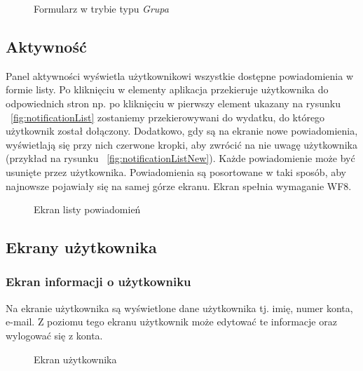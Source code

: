 \begin{figure}[h!]%
    \centering
    \caption{Formularz w trybie typu \emph{Grupa}}
\end{figure}

\clearpage
\subsection{Aktywność}
Panel aktywności wyświetla użytkownikowi wszystkie dostępne powiadomienia w formie listy. Po kliknięciu w elementy aplikacja przekieruje użytkownika do odpowiednich stron np. po kliknięciu w pierwszy element ukazany na rysunku ~\ref{fig:notificationList} zostaniemy przekierowywani do wydatku, do którego użytkownik został dołączony. Dodatkowo, gdy są na ekranie nowe powiadomienia, wyświetlają się przy nich czerwone kropki, aby zwrócić na nie uwagę użytkownika (przykład na rysunku ~\ref{fig:notificationListNew}). Każde powiadomienie może być usunięte przez użytkownika. Powiadomienia są posortowane w taki sposób, aby najnowsze pojawiały się na samej górze ekranu. Ekran spełnia wymaganie WF8.

\begin{figure}[h!]%
    \centering
    \qquad
    \caption{Ekran listy powiadomień}%
\end{figure}

\clearpage
\subsection{Ekrany użytkownika}
\subsubsection{Ekran informacji o użytkowniku}
Na ekranie użytkownika są wyświetlone dane użytkownika tj. imię, numer konta, e-mail. Z poziomu tego ekranu użytkownik może edytować te informacje oraz wylogować się z konta.

\begin{figure}[h!]%
    \centering
    \qquad
    \caption{Ekran użytkownika}%
\end{figure}

